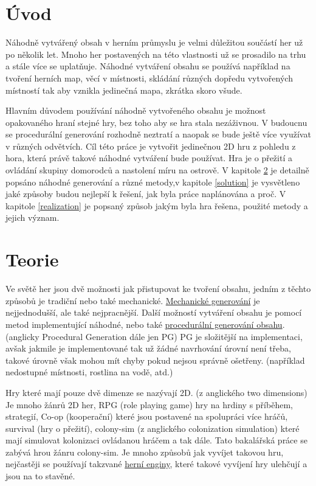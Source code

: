 
\chapter{Úvod}
Náhodně vytvářený obsah v herním průmyslu je velmi důležitou součástí her už po několik let. Mnoho her postavených na této vlastnosti už se prosadilo na trhu a stále více se uplatňuje. Náhodné vytváření obsahu se používá například na tvoření herních map, věcí v místnosti, skládání různých dopředu vytvořených místností tak aby vznikla jedinečná mapa, zkrátka skoro všude. 

Hlavním důvodem používání náhodně vytvořeného obsahu je možnost opakovaného hraní stejné hry, bez toho aby se hra stala nezáživnou. V budoucnu se procedurální generování rozhodně neztratí a naopak se bude ještě více využívat v různých odvětvích. Cíl této práce je vytvořit jedinečnou 2D hru z pohledu z hora, která právě takové náhodné vytváření bude používat. Hra je o přežití a ovládání skupiny domorodců a nastolení míru na ostrově. V kapitole \ref{Teorie} je detailně popsáno náhodné generování a různé metody,v kapitole \ref{solution} je vysvětleno jaké způsoby budou nejlepší k řešení, jak byla práce naplánována a proč. V kapitole \ref{realization} je popsaný způsob jakým byla hra řešena, použité metody a jejich význam.

\chapter{Teorie} 
\label{Teorie}
Ve světě her jsou dvě možnosti jak přistupovat ke tvoření obsahu, jedním z těchto způsobů je tradiční nebo také mechanické. \hyperref[traditional]{Mechanické generování} je nejjednodušší, ale také nejpracnější. Další možností vytváření obsahu je pomocí metod implementující náhodné, nebo také \hyperref[procedural]{procedurální generování obsahu}. (anglicky Procedural Generation dále jen PG) PG je složitější na implementaci, avšak jakmile je implementované tak už žádné navrhování úrovní není třeba, takové úrovně však mohou mít chyby pokud nejsou správně ošetřeny. (například nedostupné místnosti, rostlina na vodě, atd.)

Hry které mají pouze dvě dimenze se nazývají 2D. (z anglického two dimensions) Je mnoho žánrů 2D her, RPG (role playing game) hry na hrdiny s příběhem, strategií, Co-op (kooperační) které jsou postavené na spolupráci více hráčů, survival (hry o přežití), colony-sim (z anglického colonization simulation) které mají simulovat kolonizaci ovládanou hráčem a tak dále. Tato bakalářská práce se zabývá hrou žánru colony-sim. Je mnoho způsobů jak vyvíjet takovou hru, nejčastěji se používají takzvané \hyperref[enginy]{herní enginy}, které takové vyvíjení hry ulehčují a jsou na to stavěné.


